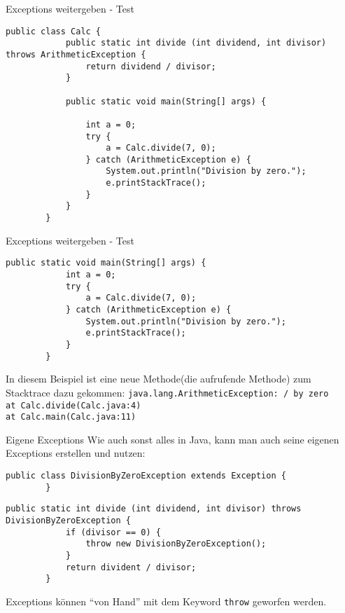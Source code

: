 \begin{frame}[fragile]{Exceptions weitergeben - Test}
    \begin{lstlisting}[gobble=8]
        public class Calc {
            public static int divide (int dividend, int divisor) throws ArithmeticException {
                return dividend / divisor;
            }

            public static void main(String[] args) {

                int a = 0;
                try {
                    a = Calc.divide(7, 0);
                } catch (ArithmeticException e) {
                    System.out.println("Division by zero.");
                    e.printStackTrace();
                }
            }
        }
    \end{lstlisting}
\end{frame}

\begin{frame}[fragile]{Exceptions weitergeben - Test}
    \begin{lstlisting}[gobble=8]
        public static void main(String[] args) {
            int a = 0;
            try {
                a = Calc.divide(7, 0);
            } catch (ArithmeticException e) {
                System.out.println("Division by zero.");
                e.printStackTrace();
            }
        }
    \end{lstlisting}
    In diesem Beispiel ist eine neue Methode(die aufrufende Methode) zum Stacktrace dazu gekommen:
    \texttt{java.lang.ArithmeticException: / by zero}\\
    \texttt{at Calc.divide(Calc.java:4)}\\
    \texttt{at Calc.main(Calc.java:11)}
\end{frame}

\begin{frame}[fragile]{Eigene Exceptions}
    Wie auch sonst alles in Java, kann man auch seine eigenen Exceptions erstellen und nutzen:
    \begin{lstlisting}[gobble=8]
        public class DivisionByZeroException extends Exception {
        }
    \end{lstlisting}
    \vfill
    \begin{lstlisting}[gobble=8]
        public static int divide (int dividend, int divisor) throws DivisionByZeroException {
            if (divisor == 0) {
                throw new DivisionByZeroException();
            }
            return divident / divisor;
        }
    \end{lstlisting}
    Exceptions können \enquote{von Hand} mit dem Keyword \texttt{throw} geworfen werden.
\end{frame}

